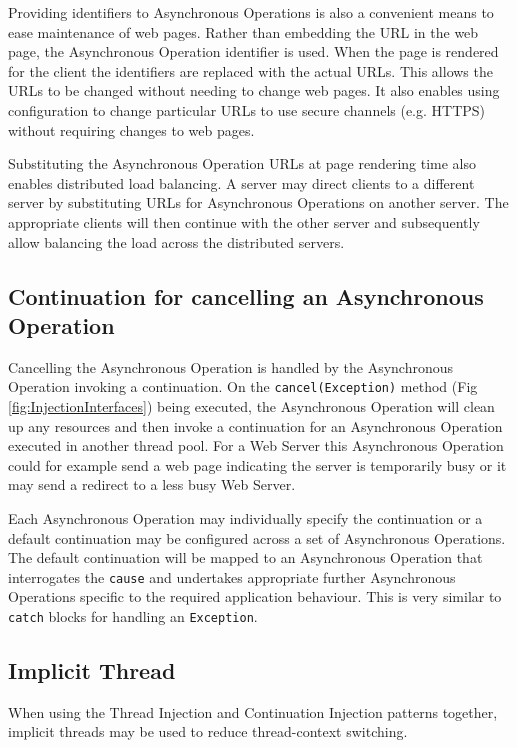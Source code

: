 \documentclass[prodmode]{style/acmlarge}
\begin{document}
Providing identifiers to Asynchronous Operations is also a convenient means to
ease maintenance of web pages.  Rather than embedding the URL in the web page,
the Asynchronous Operation identifier is used.  When the page is rendered for
the client the identifiers are replaced with the actual URLs.  This allows the
URLs to be changed without needing to change web pages.  It also enables using
configuration to change particular URLs to use secure channels (e.g. HTTPS)
without requiring changes to web pages.

Substituting the Asynchronous Operation URLs at page rendering time also enables
distributed load balancing.  A server may direct clients to a different server
by substituting URLs for Asynchronous Operations on another server. The
appropriate clients will then continue with the other server and subsequently
allow balancing the load across the distributed servers.


\subsection{Continuation for cancelling an Asynchronous Operation}

Cancelling the Asynchronous Operation is handled by the Asynchronous Operation
invoking a continuation.  On the \texttt{cancel(Exception)} method (Fig
\ref{fig:InjectionInterfaces}) being executed, the Asynchronous Operation will
clean up any resources and then invoke a continuation for an Asynchronous
Operation executed in another thread pool.  For a Web Server this Asynchronous
Operation could for example send a web page indicating the server is temporarily
busy or it may send a redirect to a less busy Web Server.

Each Asynchronous Operation may individually specify the continuation or a
default continuation may be configured across a set of Asynchronous Operations.
The default continuation will be mapped to an Asynchronous Operation that
interrogates the \texttt{cause} and undertakes appropriate further Asynchronous
Operations specific to the required application behaviour.  This is very similar
to \texttt{catch} blocks for handling an \texttt{Exception}.


\subsection{Implicit Thread}

When using the Thread Injection and Continuation Injection patterns together,
implicit threads may be used to reduce thread-context switching.
\end{document}

